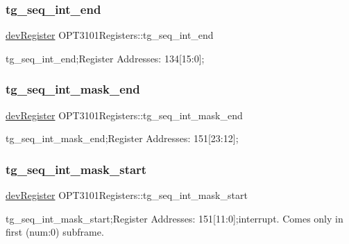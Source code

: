 \subsubsection{\texorpdfstring{tg\+\_\+seq\+\_\+int\+\_\+end}{tg\_seq\_int\_end}}
{\footnotesize\ttfamily \mbox{\hyperlink{classdev_register}{dev\+Register}} O\+P\+T3101\+Registers\+::tg\+\_\+seq\+\_\+int\+\_\+end}



tg\+\_\+seq\+\_\+int\+\_\+end;Register Addresses\+: 134\mbox{[}15\+:0\mbox{]}; 

\mbox{\label{class_o_p_t3101_registers_a3000807e764e22ef7ba00dd00a1c0198}} 
\subsubsection{\texorpdfstring{tg\+\_\+seq\+\_\+int\+\_\+mask\+\_\+end}{tg\_seq\_int\_mask\_end}}
{\footnotesize\ttfamily \mbox{\hyperlink{classdev_register}{dev\+Register}} O\+P\+T3101\+Registers\+::tg\+\_\+seq\+\_\+int\+\_\+mask\+\_\+end}



tg\+\_\+seq\+\_\+int\+\_\+mask\+\_\+end;Register Addresses\+: 151\mbox{[}23\+:12\mbox{]}; 

\mbox{\label{class_o_p_t3101_registers_a7dbacbd8033f00547b6b465a49895a90}} 
\subsubsection{\texorpdfstring{tg\+\_\+seq\+\_\+int\+\_\+mask\+\_\+start}{tg\_seq\_int\_mask\_start}}
{\footnotesize\ttfamily \mbox{\hyperlink{classdev_register}{dev\+Register}} O\+P\+T3101\+Registers\+::tg\+\_\+seq\+\_\+int\+\_\+mask\+\_\+start}



tg\+\_\+seq\+\_\+int\+\_\+mask\+\_\+start;Register Addresses\+: 151\mbox{[}11\+:0\mbox{]};interrupt. Comes only in first (num\+:0) subframe. 

